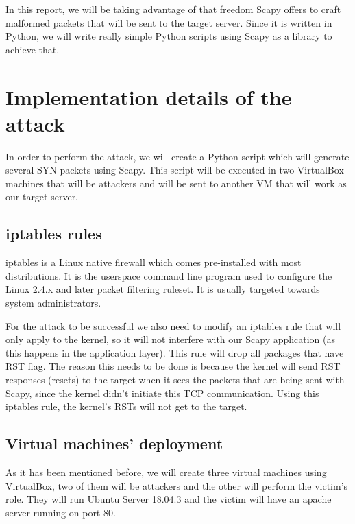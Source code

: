 \documentclass[11pt]{article}
\begin{document}
In this report, we will be taking advantage of that freedom Scapy offers to craft malformed packets that will be sent to the target server. Since it is written in Python, we will write really simple Python scripts using Scapy as a library to achieve that.
\clearpage

\section{Implementation details of the attack}
In order to perform the attack, we will create a Python script which will generate several SYN packets using Scapy. This script will be executed in two VirtualBox machines that will be attackers and will be sent to another VM that will work as our target server.\vspace{5mm}

\subsection{iptables rules}
iptables is a Linux native firewall which comes pre-installed with most distributions. It is the userspace command line program used to configure the Linux 2.4.x and later packet filtering ruleset. It is usually targeted towards system administrators.\vspace{5mm}

For the attack to be successful we also need to modify an iptables rule that will only apply to the kernel, so it will not interfere with our Scapy application (as this happens in the application layer). This rule will drop all packages that have RST flag. The reason this needs to be done is because the kernel will send RST responses (resets) to the target when it sees the packets that are being sent with Scapy, since the kernel didn’t initiate this TCP communication. Using this iptables rule, the kernel’s RSTs will not get to the target.\vspace{5mm}

\subsection{Virtual machines' deployment}
As it has been mentioned before, we will create three virtual machines using VirtualBox, two of them will be attackers and the other will perform the victim's role. They will run Ubuntu Server 18.04.3 and the victim will have an apache server running on port 80.\vspace{5mm}
\end{document}

